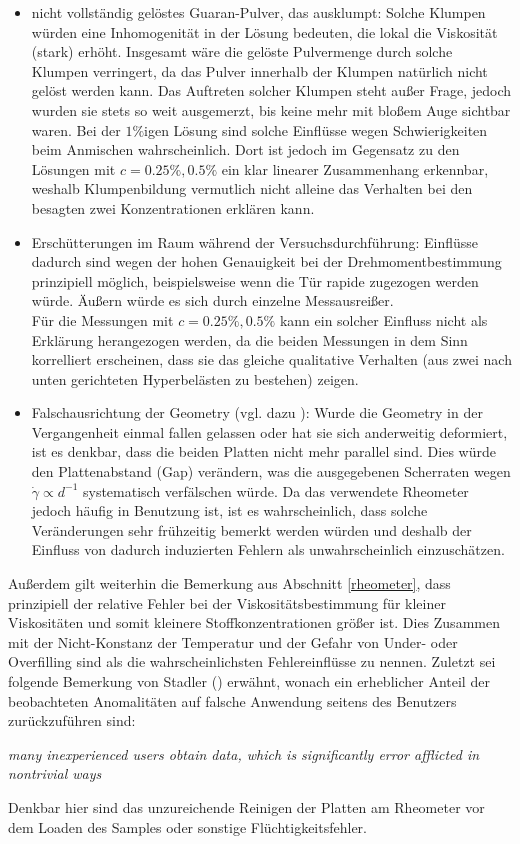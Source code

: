 \documentclass[11pt,a4paper,oneside]{scrartcl}
\begin{document}
\begin{itemize}
\item nicht vollständig gelöstes Guaran-Pulver, das ausklumpt: Solche Klumpen würden eine Inhomogenität in der Lösung bedeuten, die lokal die Viskosität (stark) erhöht. Insgesamt wäre die gelöste Pulvermenge durch solche Klumpen verringert, da das Pulver innerhalb der Klumpen natürlich nicht gelöst werden kann. Das Auftreten solcher Klumpen steht außer Frage, jedoch wurden sie stets so weit ausgemerzt, bis keine mehr mit bloßem Auge sichtbar waren. Bei der $1\%$igen Lösung sind solche Einflüsse wegen Schwierigkeiten beim Anmischen wahrscheinlich. Dort ist jedoch im Gegensatz zu den Lösungen mit $c=0.25\%,0.5\%$ ein klar linearer Zusammenhang erkennbar, weshalb Klumpenbildung vermutlich nicht alleine das Verhalten bei den besagten zwei Konzentrationen erklären kann.
\item Erschütterungen im Raum während der Versuchsdurchführung: Einflüsse dadurch sind wegen der hohen Genauigkeit bei der Drehmomentbestimmung prinzipiell möglich, beispielsweise wenn die Tür rapide zugezogen werden würde. Äußern würde es sich durch einzelne Messausreißer.\\
Für die Messungen mit $c=0.25\%,0.5\%$ kann ein solcher Einfluss nicht als Erklärung herangezogen werden, da die beiden Messungen in dem Sinn korrelliert erscheinen, dass sie das gleiche qualitative Verhalten (aus zwei nach unten gerichteten Hyperbelästen zu bestehen) zeigen.
\item Falschausrichtung der Geometry (vgl. dazu \cite{Stadler2014}): Wurde die Geometry in der Vergangenheit einmal fallen gelassen oder hat sie sich anderweitig deformiert, ist es denkbar, dass die beiden Platten nicht mehr parallel sind. Dies würde den Plattenabstand (Gap) verändern, was die ausgegebenen Scherraten wegen $\dot\gamma\propto d^{-1}$ systematisch verfälschen würde. Da das verwendete Rheometer jedoch häufig in Benutzung ist, ist es wahrscheinlich, dass solche Veränderungen sehr frühzeitig bemerkt werden würden und deshalb der Einfluss von dadurch induzierten Fehlern als unwahrscheinlich einzuschätzen.
\end{itemize}
Außerdem gilt weiterhin die Bemerkung aus Abschnitt \ref{rheometer}, dass prinzipiell der relative Fehler bei der Viskositätsbestimmung für kleiner Viskositäten und somit kleinere Stoffkonzentrationen größer ist. Dies Zusammen mit der Nicht-Konstanz der Temperatur und der Gefahr von Under- oder Overfilling sind als die wahrscheinlichsten Fehlereinflüsse zu nennen. Zuletzt sei folgende Bemerkung von Stadler (\cite{Stadler2014}) erwähnt, wonach ein erheblicher Anteil der beobachteten Anomalitäten auf falsche Anwendung seitens des Benutzers zurückzuführen sind:\par
\begin{centering}
\emph{
\glqq many inexperienced users obtain data, which is significantly error afflicted in nontrivial ways\grqq
}\\
\end{centering}
\par
Denkbar hier sind das unzureichende Reinigen der Platten am Rheometer vor dem Loaden des Samples oder sonstige Flüchtigkeitsfehler.
\end{document}
